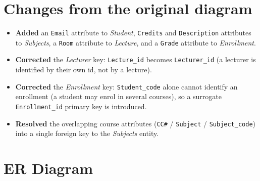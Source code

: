 \documentclass[11pt]{article}
\begin{document}
\section*{Changes from the original diagram}

\begin{itemize}
  \item \textbf{Added} an \texttt{Email} attribute to \emph{Student},
        \texttt{Credits} and \texttt{Description} attributes to \emph{Subjects}, a
        \texttt{Room} attribute to \emph{Lecture}, and a \texttt{Grade} attribute
        to \emph{Enrollment}.
  \item \textbf{Corrected} the \emph{Lecturer} key: \texttt{Lecture\_id} becomes
        \texttt{Lecturer\_id} (a lecturer is identified by their own id, not by a
        lecture).
  \item \textbf{Corrected} the \emph{Enrollment} key: \texttt{Student\_code} alone
        cannot identify an enrollment (a student may enrol in several courses), so
        a surrogate \texttt{Enrollment\_id} primary key is introduced.
  \item \textbf{Resolved} the overlapping course attributes
        (\texttt{CC\#} / \texttt{Subject} / \texttt{Subject\_code}) into a single
        foreign key to the \emph{Subjects} entity.
\end{itemize}

\section*{ER Diagram}
\end{document}

